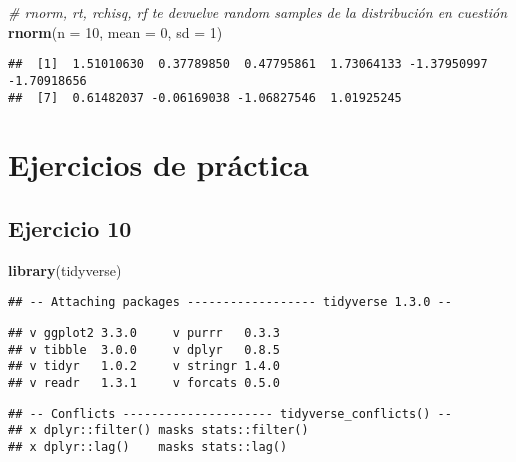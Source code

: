 \documentclass[]{book}
\newenvironment{Shaded}{\begin{snugshade}}{\end{snugshade}}
\newcommand{\CommentTok}[1]{\textcolor[rgb]{0.56,0.35,0.01}{\textit{#1}}}
\newcommand{\DataTypeTok}[1]{\textcolor[rgb]{0.13,0.29,0.53}{#1}}
\newcommand{\DecValTok}[1]{\textcolor[rgb]{0.00,0.00,0.81}{#1}}
\newcommand{\KeywordTok}[1]{\textcolor[rgb]{0.13,0.29,0.53}{\textbf{#1}}}
\newcommand{\NormalTok}[1]{#1}
\begin{document}
\begin{Shaded}
\begin{Highlighting}[]
\CommentTok{# rnorm, rt, rchisq, rf te devuelve random samples de la distribución en cuestión}
\KeywordTok{rnorm}\NormalTok{(}\DataTypeTok{n =} \DecValTok{10}\NormalTok{, }\DataTypeTok{mean =} \DecValTok{0}\NormalTok{, }\DataTypeTok{sd =} \DecValTok{1}\NormalTok{)}
\end{Highlighting}
\end{Shaded}

\begin{verbatim}
##  [1]  1.51010630  0.37789850  0.47795861  1.73064133 -1.37950997 -1.70918656
##  [7]  0.61482037 -0.06169038 -1.06827546  1.01925245
\end{verbatim}

\hypertarget{ejercicios-de-pruxe1ctica-2}{%
\section{Ejercicios de práctica}\label{ejercicios-de-pruxe1ctica-2}}

\hypertarget{ejercicio-10}{%
\subsection{Ejercicio 10}\label{ejercicio-10}}

\begin{Shaded}
\begin{Highlighting}[]
\KeywordTok{library}\NormalTok{(tidyverse)}
\end{Highlighting}
\end{Shaded}

\begin{verbatim}
## -- Attaching packages ------------------ tidyverse 1.3.0 --
\end{verbatim}

\begin{verbatim}
## v ggplot2 3.3.0     v purrr   0.3.3
## v tibble  3.0.0     v dplyr   0.8.5
## v tidyr   1.0.2     v stringr 1.4.0
## v readr   1.3.1     v forcats 0.5.0
\end{verbatim}

\begin{verbatim}
## -- Conflicts --------------------- tidyverse_conflicts() --
## x dplyr::filter() masks stats::filter()
## x dplyr::lag()    masks stats::lag()
\end{verbatim}
\end{document}
